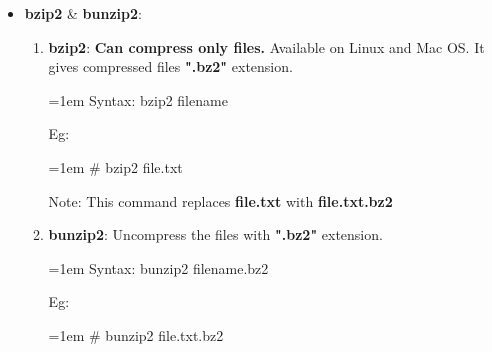 \begin{flushleft}
\begin{itemize}
		
		
		\item \textbf{bzip2} \& \textbf{bunzip2}:
		\begin{enumerate}
			\item \textbf{bzip2}: \textbf{Can compress only files.} Available on Linux and Mac OS.  It gives compressed files \textbf{".bz2"} extension.
			\bigskip
			\begin{tcolorbox}[breakable,notitle,boxrule=0pt,colback=pink,colframe=pink]
				\color{black}
				\font=1em
				Syntax: bzip2 filename
				\font=4pt
			\end{tcolorbox}
			Eg:
			\begin{tcolorbox}[breakable,notitle,boxrule=-0pt,colback=black,colframe=black]
				\color{green}
				\font=1em
				\# bzip2 file.txt
				\font=4pt
			\end{tcolorbox}
			
			\bigskip
			\begin{tcolorbox}[breakable,notitle,boxrule=0pt,colback=yellow,colframe=yellow]
				\color{black}
				Note: This command replaces \textbf{file.txt} with \textbf{file.txt.bz2}
			\end{tcolorbox}
			
			
			\item \textbf{bunzip2}: Uncompress the files with \textbf{".bz2"} extension.
			\bigskip
			\begin{tcolorbox}[breakable,notitle,boxrule=0pt,colback=pink,colframe=pink]
				\color{black}
				\font=1em
				Syntax: bunzip2 filename.bz2
				\font=4pt
			\end{tcolorbox}
			Eg:
			\begin{tcolorbox}[breakable,notitle,boxrule=-0pt,colback=black,colframe=black]
				\color{green}
				\font=1em
				\# bunzip2 file.txt.bz2
				\font=4pt
			\end{tcolorbox}		
		\end{enumerate}		
		
		\newpage
		

\end{itemize}
\end{flushleft}
